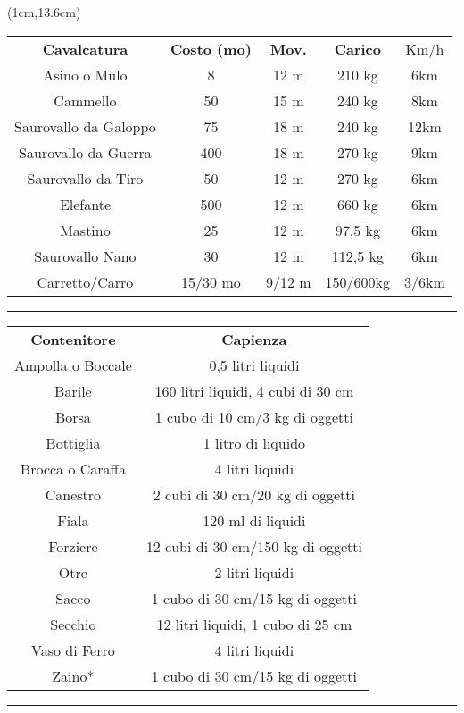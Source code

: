 \documentclass[a4paper,12 pt,openany]{book}
\newcommand{\riga}{\rule{\textwidth}{0.4pt}}
\begin{document}
\begin{textblock*}{12cm}(1cm,13.6cm) %

\begin{tabular}{ccccc}
\hline
\textbf{Cavalcatura}&\textbf{Costo (mo)}&\textbf{Mov.}&\textbf{Carico}&Km/h\\
Asino o Mulo&8&12 m&210 kg&6km\\
Cammello&50&15 m&240 kg&8km\\
Saurovallo da Galoppo&75&18 m&240 kg&12km\\
Saurovallo da Guerra&400&18 m&270 kg&9km\\
Saurovallo da Tiro&50&12 m&270 kg&6km\\
Elefante&500&12 m&660 kg&6km\\
Mastino&25&12 m&97,5 kg&6km\\
Saurovallo Nano&30&12 m&112,5 kg&6km\\
Carretto/Carro    & 15/30 mo & 9/12 m   &150/600kg    & 3/6km              \\
\end{tabular}

\riga

\begin{tabular}{cc}

\textbf{Contenitore}&\textbf{Capienza}\\
Ampolla o Boccale&0,5 litri liquidi\\
Barile&			160 litri liquidi, 4 cubi di 30 cm\\
Borsa&			1 cubo di 10 cm/3 kg di oggetti\\
Bottiglia&		1 litro di liquido\\
Brocca o Caraffa&4 litri liquidi\\
Canestro&		2 cubi di 30 cm/20 kg di oggetti\\
Fiala&			120 ml di liquidi\\
Forziere&		12 cubi di 30 cm/150 kg di oggetti\\
Otre&			2 litri liquidi\\
Sacco&			1 cubo di 30 cm/15 kg di oggetti\\
Secchio&		12 litri liquidi, 1 cubo di 25 cm\\
Vaso di Ferro&	4 litri liquidi\\
Zaino*&			1 cubo di 30 cm/15 kg di oggetti\\
\end{tabular}


\riga



\end{textblock*}
\end{document}
